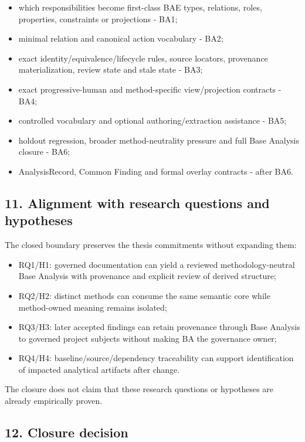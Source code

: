 \documentclass[
  10pt,
]{article}
\providecommand{\tightlist}{%
  \setlength{\itemsep}{0pt}\setlength{\parskip}{0pt}}
\begin{document}
\begin{itemize}
\tightlist
\item
  which responsibilities become first-class BAE types, relations, roles,
  properties, constraints or projections - BA1;
\item
  minimal relation and canonical action vocabulary - BA2;
\item
  exact identity/equivalence/lifecycle rules, source locators,
  provenance materialization, review state and stale state - BA3;
\item
  exact progressive-human and method-specific view/projection contracts
  - BA4;
\item
  controlled vocabulary and optional authoring/extraction assistance -
  BA5;
\item
  holdout regression, broader method-neutrality pressure and full Base
  Analysis closure - BA6;
\item
  AnalysisRecord, Common Finding and formal overlay contracts - after
  BA6.
\end{itemize}

\subsection{11. Alignment with research questions and
hypotheses}\label{alignment-with-research-questions-and-hypotheses}

The closed boundary preserves the thesis commitments without expanding
them:

\begin{itemize}
\tightlist
\item
  RQ1/H1: governed documentation can yield a reviewed
  methodology-neutral Base Analysis with provenance and explicit review
  of derived structure;
\item
  RQ2/H2: distinct methods can consume the same semantic core while
  method-owned meaning remains isolated;
\item
  RQ3/H3: later accepted findings can retain provenance through Base
  Analysis to governed project subjects without making BA the governance
  owner;
\item
  RQ4/H4: baseline/source/dependency traceability can support
  identification of impacted analytical artifacts after change.
\end{itemize}

The closure does not claim that these research questions or hypotheses
are already empirically proven.

\subsection{12. Closure decision}\label{closure-decision}
\end{document}
